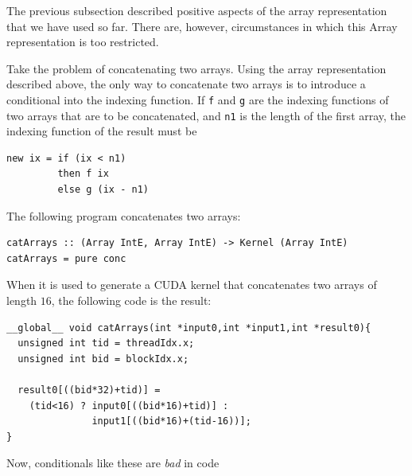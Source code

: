 \documentclass[]{sigplanconf}
\begin{document}


The previous subsection described positive aspects of the array 
representation that we have used so far. There are, however, 
circumstances in which this Array representation is too restricted. 

Take the problem of concatenating two arrays. Using the array representation 
described above, the only way to concatenate two arrays is to introduce 
a conditional into the indexing function. If {\tt f} and {\tt g} are the 
indexing functions of two arrays that are to be concatenated, and {\tt n1}
is the length of the first array, the indexing 
function of the result must be
\begin{codesize}
\begin{verbatim}
new ix = if (ix < n1) 
         then f ix 
         else g (ix - n1)
\end{verbatim}
\end{codesize}
The following program
concatenates two arrays: 
\begin{codesize}
\begin{verbatim}
catArrays :: (Array IntE, Array IntE) -> Kernel (Array IntE)
catArrays = pure conc
\end{verbatim}
\end{codesize}
When it is used to generate a CUDA kernel that concatenates
two arrays of length $16$, the following code is the result: 
\begin{codesize}
\begin{verbatim}
__global__ void catArrays(int *input0,int *input1,int *result0){
  unsigned int tid = threadIdx.x;
  unsigned int bid = blockIdx.x;
  
  result0[((bid*32)+tid)] = 
    (tid<16) ? input0[((bid*16)+tid)] : 
               input1[((bid*16)+(tid-16))];
}
\end{verbatim}
\end{codesize}
%  
%  
Now, conditionals like these are {\em bad} in code 
\end{document}
